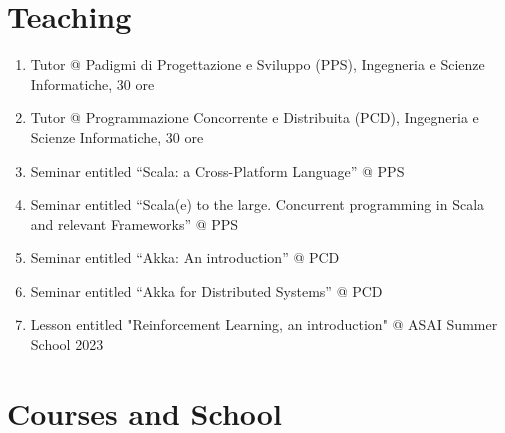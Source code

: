 \documentclass[11pt]{article}
\begin{document}
\section{Teaching}
\begin{enumerate}
	\item Tutor @ Padigmi di Progettazione e Sviluppo (PPS), Ingegneria e Scienze Informatiche, 30 ore
	\item Tutor @ Programmazione Concorrente e Distribuita (PCD), Ingegneria e Scienze Informatiche, 30 ore
	\item Seminar entitled ``Scala: a Cross-Platform Language'' @ PPS
	\item Seminar entitled ``Scala(e) to the large. Concurrent programming in Scala and relevant Frameworks'' @ PPS
	\item Seminar entitled ``Akka: An introduction'' @ PCD
	\item Seminar entitled ``Akka for Distributed Systems'' @ PCD
	\item Lesson entitled "Reinforcement Learning, an introduction" @ ASAI Summer School 2023
\end{enumerate}
\section{Courses and School}
\end{document}
